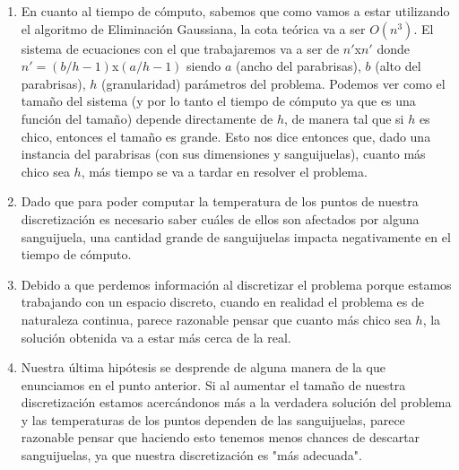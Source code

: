 \begin{enumerate}
\item En cuanto al tiempo de cómputo, sabemos que como vamos a estar utilizando el algoritmo de Eliminación Gaussiana, la cota teórica va a ser $O(n^3)$. El sistema de ecuaciones con el que trabajaremos va a ser de $n'$x$n'$ donde $n' = (b/h - 1)$x$(a/h - 1)$ siendo $a$ (ancho del parabrisas), $b$ (alto del parabrisas), $h$ (granularidad) parámetros del problema. Podemos ver como el tamaño del sistema (y por lo tanto el tiempo de cómputo ya que es una función del tamaño) depende directamente de $h$, de manera tal que si $h$ es chico, entonces el tamaño es grande. Esto nos dice entonces que, dado una instancia del parabrisas (con sus dimensiones y sanguijuelas), cuanto más chico sea $h$, más tiempo se va a tardar en resolver el problema.
\item Dado que para poder computar la temperatura de los puntos de nuestra discretización es necesario saber cuáles de ellos son afectados por alguna sanguijuela, una cantidad grande de sanguijuelas impacta negativamente en el tiempo de cómputo.
\item Debido a que perdemos información al discretizar el problema porque estamos trabajando con un espacio discreto, cuando en realidad el problema es de naturaleza continua, parece razonable pensar que cuanto más chico sea $h$, la solución obtenida va a estar más cerca de la real.
\item Nuestra última hipótesis se desprende de alguna manera de la que enunciamos en el punto anterior. Si al aumentar el tamaño de nuestra discretización estamos acercándonos más a la verdadera solución del problema y las temperaturas de los puntos dependen de las sanguijuelas, parece razonable pensar que haciendo esto tenemos menos chances de descartar sanguijuelas, ya que nuestra discretización es "más adecuada".
\newline
\par 
\end{enumerate}


